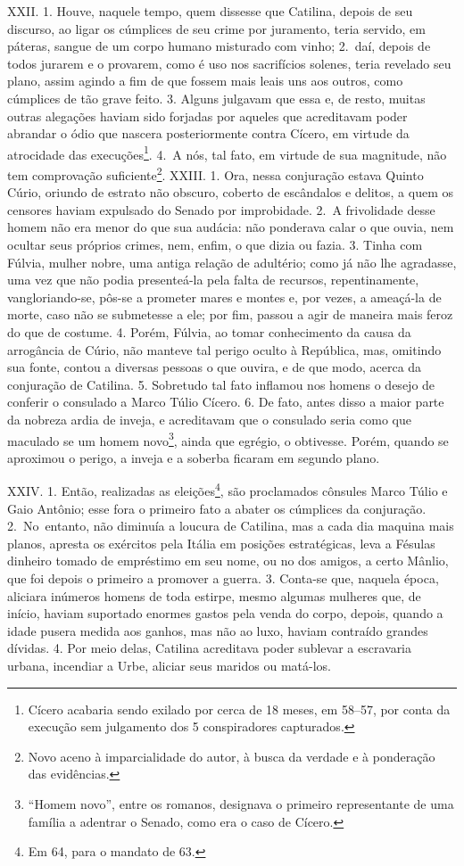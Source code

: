 XXII. 1. Houve, naquele tempo, quem dissesse que Catilina, depois de seu
discurso, ao ligar os cúmplices de seu crime por juramento, teria servido, em
páteras, sangue de um corpo humano misturado com vinho; 2.~daí, depois de todos
jurarem e o provarem, como é uso nos sacrifícios solenes, teria revelado
seu plano, assim agindo a fim de que fossem mais leais uns aos outros, como
cúmplices de tão grave feito. 3. Alguns julgavam que essa e, de resto, muitas
outras alegações haviam sido forjadas por aqueles que acreditavam poder
abrandar o ódio que nascera posteriormente contra Cícero, em virtude da
atrocidade das execuções\footnote{Cícero acabaria sendo exilado por cerca de 18
meses, em 58--57, por conta da execução sem julgamento dos 5 conspiradores
capturados.}. 4.~A nós, tal fato, em virtude de sua magnitude, não tem
comprovação suficiente\footnote{Novo aceno à imparcialidade do autor, à busca
da verdade e à ponderação das evidências.}.  XXIII. 1. Ora, nessa conjuração
estava Quinto Cúrio, oriundo de estrato não obscuro, coberto de escândalos e
delitos, a quem os censores haviam expulsado do Senado por improbidade. 2.~A
frivolidade desse homem não era menor do que sua audácia: não ponderava calar o
que ouvia, nem ocultar seus próprios crimes, nem, enfim, o que dizia ou fazia.
3. Tinha com Fúlvia, mulher nobre, uma antiga relação de adultério; como já não lhe agradasse, uma vez que não podia presenteá-la pela falta de recursos,
repentinamente, vangloriando-se, pôs-se a prometer mares e montes e, por vezes,
a ameaçá-la de morte, caso não se submetesse a ele; por fim, passou a agir de
maneira mais feroz do que de costume. 4. Porém, Fúlvia, ao tomar conhecimento
da causa da arrogância de Cúrio, não manteve tal perigo oculto à República,
mas, omitindo sua fonte, contou a diversas pessoas o que ouvira, e de que modo,
acerca da conjuração de Catilina. 5. Sobretudo tal fato inflamou nos homens o
desejo de conferir o consulado a Marco Túlio Cícero. 6. De fato, antes disso a
maior parte da nobreza ardia de inveja, e acreditavam que o consulado seria
como que maculado se um homem novo\footnote{``Homem novo'', entre os romanos,
designava o primeiro representante de uma família a adentrar o Senado, como era
o caso de Cícero.}, ainda que egrégio, o obtivesse. Porém, quando se aproximou
o perigo, a inveja e a soberba ficaram em segundo plano.

XXIV. 1. Então, realizadas as eleições\footnote{Em 64, para o mandato de  63.},
são proclamados cônsules Marco Túlio e Gaio Antônio; esse fora o primeiro fato
a abater os cúmplices da conjuração. \mbox{2. No entanto}, não diminuía a loucura de
Catilina, mas a cada dia maquina mais planos, apresta os exércitos pela Itália
em posições estratégicas, leva a Fésulas dinheiro tomado de empréstimo em seu
nome, ou no dos amigos, a certo Mânlio, que foi depois o primeiro a promover a
guerra. 3. Conta-se que, naquela época, aliciara inúmeros homens de toda
estirpe, mesmo algumas mulheres que, de início, haviam suportado enormes gastos
pela venda do corpo, depois, quando a idade pusera medida aos ganhos, mas não
ao luxo, haviam contraído grandes dívidas. 4. Por meio delas, Catilina
acreditava poder sublevar a escravaria urbana, incendiar a Urbe, aliciar seus
maridos ou matá-los.


